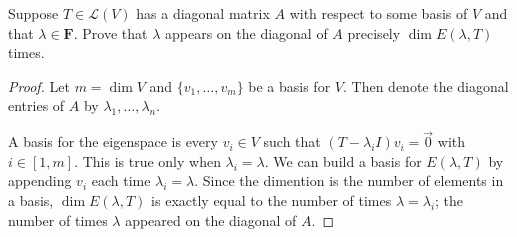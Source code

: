 Suppose $T \in \mathcal{L}(V)$ has a diagonal matrix $A$ with respect to some basis of $V$ and that $\lambda \in \mathbf{F}$.  Prove that $\lambda$ appears on the diagonal of $A$ precisely $\dim E(\lambda , T)$ times.
\begin{mybox}
    \begin{proof}
        Let $m = \dim V$ and $\{v_1, \dots, v_m\}$ be a basis for $V$. Then denote the diagonal entries of $A$ by $\lambda_1, \dots, \lambda_n$. 

        \nl A basis for the eigenspace is every $v_i \in V$ such that $(T-\lambda_i I)v_i = \vec{0}$ with $i \in [1,m]$. This is true only when $\lambda_i = \lambda$. We can build a basis for $E(\lambda, T)$ by appending $v_i$ each time $\lambda_i = \lambda$. Since the dimention is the number of elements in a basis, $\dim E(\lambda,T)$ is exactly equal to the number of times $\lambda = \lambda_i$; the number of times $\lambda$ appeared on the diagonal of $A$.
    \end{proof}
\end{mybox}